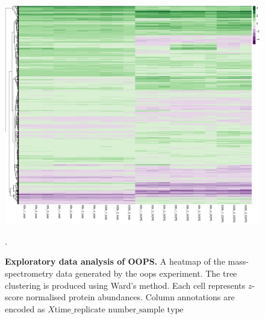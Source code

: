 \documentclass[12pt,english, journal=jpr, layout=twocolumn]{article}
\begin{document}
\begin{figure}[h!]
	\centering
	\includegraphics[width =1.1\textwidth]{oopsheatmap.pdf}
	\caption{\textbf{Exploratory data analysis of OOPS.} A heatmap of the mass-spectrometry data generated by the oops experiment. The tree clustering is produced using Ward's method. Each cell represents $z$-score normalised protein abundances. Column annotations are encoded as $X{\text{time}}\_{\text{replicate number}}\_{\text{sample type}}$}.
	\label{figure::figure1}
\end{figure}
\end{document}
